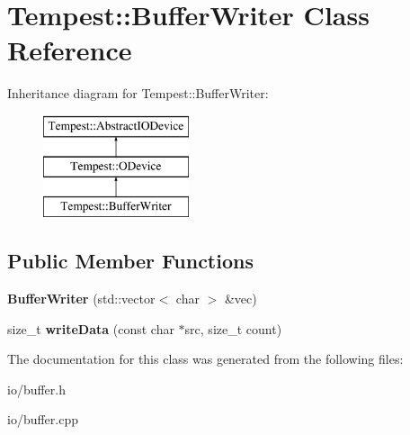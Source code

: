 \hypertarget{class_tempest_1_1_buffer_writer}{\section{Tempest\+:\+:Buffer\+Writer Class Reference}
\label{class_tempest_1_1_buffer_writer}
}
Inheritance diagram for Tempest\+:\+:Buffer\+Writer\+:\begin{figure}[H]
\begin{center}
\leavevmode
\includegraphics[height=3.000000cm]{class_tempest_1_1_buffer_writer}
\end{center}
\end{figure}
\subsection*{Public Member Functions}
\begin{DoxyCompactItemize}
\item 
\hypertarget{class_tempest_1_1_buffer_writer_a3f12ab32e9db8dff08d748c71b5d3f73}{{\bfseries Buffer\+Writer} (std\+::vector$<$ char $>$ \&vec)}\label{class_tempest_1_1_buffer_writer_a3f12ab32e9db8dff08d748c71b5d3f73}

\item 
\hypertarget{class_tempest_1_1_buffer_writer_a8301482bb39483279fcf58a4badb6753}{size\+\_\+t {\bfseries write\+Data} (const char $\ast$src, size\+\_\+t count)}\label{class_tempest_1_1_buffer_writer_a8301482bb39483279fcf58a4badb6753}

\end{DoxyCompactItemize}


The documentation for this class was generated from the following files\+:\begin{DoxyCompactItemize}
\item 
io/buffer.\+h\item 
io/buffer.\+cpp\end{DoxyCompactItemize}
